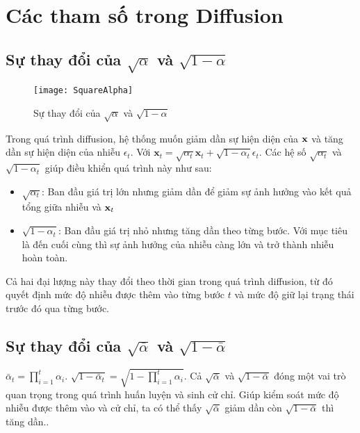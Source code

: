 \appendix
\renewcommand{\chaptername}{Phụ lục}
\chapter{Các tham số trong Diffusion}
 \label{appendix:Appendix1}

\section{Sự thay đổi của $\sqrt{\alpha}$ và $\sqrt{1 - \alpha}$}

\begin{figure}[H]
	\texttt{[image: SquareAlpha]}
	\label{fig:wrapfig}
	\caption{Sự thay đổi của $\sqrt{\alpha}$ và $\sqrt{1 - \alpha}$}
\end{figure}

Trong quá trình diffusion, hệ thống muốn giảm dần sự hiện diện của $\mathbf{x}$ và tăng dần sự hiện diện của nhiễu $\epsilon_t$. Với $\mathbf{x}_t = \sqrt{\alpha_t} \mathbf{x}_t + \sqrt{1 - \alpha_t} \epsilon_t$. Các hệ số $\sqrt{\alpha_t}$ và $\sqrt{1 - \alpha_t}$ giúp điều khiển quá trình này như sau:



\begin{itemize}
	\item $\sqrt{\alpha_t}$: Ban đầu giá trị lớn nhưng giảm dần để giảm sự ảnh hưởng vào kết quả tổng giữa nhiễu và $\mathbf{x}_t$
	\item $\sqrt{1 - \alpha_t}$: Ban đầu giá trị nhỏ nhưng tăng dần theo từng bước. Với mục tiêu là đến cuối cùng thì sự ảnh hưởng của nhiễu càng lớn và trở thành nhiễu hoàn toàn.
\end{itemize}


Cả hai đại lượng này thay đổi theo thời gian trong quá trình diffusion, từ đó quyết định mức độ nhiễu được thêm vào từng bước $t$ và mức độ giữ lại trạng thái trước đó qua từng bước.


\section{Sự thay đổi của $\sqrt{\bar{\alpha}}$ và $\sqrt{1 - \bar{\alpha}}$}

$\bar{\alpha}_t = \prod_{i=1}^t \alpha_i$.  $\sqrt{1 - \bar{\alpha}_t} = \sqrt{1 - \prod_{i=1}^t \alpha_i}$. Cả $\sqrt{\bar{\alpha}}$ và $\sqrt{1 - \bar{\alpha}}$ đóng một vai trò quan trọng trong quá trình huấn luyện và sinh cử chỉ. Giúp kiểm soát mức độ nhiễu được thêm vào và cử chỉ, ta có thể thấy $\sqrt{\bar{\alpha}}$ giảm dần còn $\sqrt{1 - \bar{\alpha}}$ thì tăng dần..


